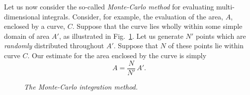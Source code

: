 Let us now consider the so-called {\em Monte-Carlo method} for evaluating multi-dimensional
integrals. Consider, for example, the evaluation of the area, $A$, enclosed by a curve, $C$.
Suppose that the curve  lies wholly within some simple domain of area $A'$, as
illustrated in Fig.~\ref{fmc}. Let us generate $N'$ points which are {\em randomly} distributed
throughout $A'$. Suppose that $N$ of these points lie within curve $C$. Our estimate for the area enclosed
by the curve is simply
\begin{equation}\label{emc}
A = \frac{N}{N'}\,A'.
\end{equation}

\begin{figure}
\epsfysize=2in
\centerline{}
\caption{\em The Monte-Carlo integration method.}\label{fmc}
\end{figure}

